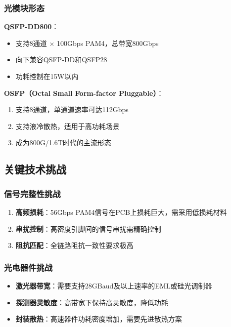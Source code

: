 \subsubsection{光模块形态}

\textbf{QSFP-DD800}：
\begin{itemize}
    \item 支持8通道 $\times$ 100Gbps PAM4，总带宽800Gbps
    \item 向下兼容QSFP-DD和QSFP28
    \item 功耗控制在15W以内
\end{itemize}

\textbf{OSFP（Octal Small Form-factor Pluggable）}：
\begin{enumerate}
    \item 支持8通道，单通道速率可达112Gbps
    \item 支持液冷散热，适用于高功耗场景
    \item 成为800G/1.6T时代的主流形态
\end{enumerate}

\subsection{关键技术挑战}

\subsubsection{信号完整性挑战}

\begin{enumerate}
    \item \textbf{高频损耗}：56Gbps PAM4信号在PCB上损耗巨大，需采用低损耗材料
    \item \textbf{串扰控制}：高密度引脚间的信号串扰需精确控制
    \item \textbf{阻抗匹配}：全链路阻抗一致性要求极高
\end{enumerate}

\subsubsection{光电器件挑战}

\begin{itemize}
    \item \textbf{激光器带宽}：需要支持28GBaud及以上速率的EML或硅光调制器
    \item \textbf{探测器灵敏度}：高带宽下保持高灵敏度，降低功耗
    \item \textbf{封装散热}：高速器件功耗密度增加，需要先进散热方案
\end{itemize}

